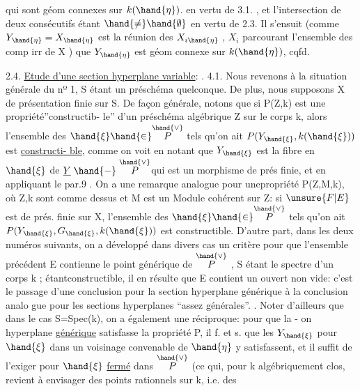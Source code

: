 
qui sont géom connexes sur $k(\hand{\eta})$. en vertu de 3.1. , et  l'intersection
de deux consécutifs étant $\hand{\neq} \hand{\emptyset}$ en vertu de 2.3. Il s'ensuit (comme
$Y_{\hand{\eta}} = X_{\hand{\eta}}$ est la réunion des $X_{i\hand{\eta}}$ , $X_i$ parcourant l'ensemble des comp
irr de X ) que  $Y_{\hand{\eta}}$ est géom connexe sur $k(\hand{\eta})$, cqfd.

2.4. \uline{Etude d'une section hyperplane variable}:  .
4.1.
Nous revenons à la situation générale du nº 1, S étant un préschéma
quelconque. De plus, nous supposons X de présentation finie sur S.
De façon générale, notons que si P(Z,k) est une propriété''constructib-%
le''  d'un préschéma algébrique Z sur le corps k,
alors l'ensemble des $\hand{\xi} \hand{\in} \overset{\hand{\vee}}{P}$ tels qu'on ait $P(Y_{\hand{\xi}},k(\hand{\xi}))$ est \uline{constructi-%
ble}, comme on voit en notant que $Y_{\hand{\xi}}$ est la fibre en $\hand{\xi}$ de $\underline{Y} \mathrel{\hand{-}} \overset{\hand{\vee}}{P}$\hand{,}qui
est un morphisme de prés finie, et en appliquant le par.9 . On a une
remarque analogue pour une\hand{|}propriété P(Z,M,k), où Z,k sont comme dessus
et M est un Module cohérent sur Z: si $\unsure{F|E}$ est de prés. finie sur X, l'ensemble
des $\hand{\xi} \hand{\in} \overset{\hand{\vee}}{P}$ tels qu'on ait $P(Y_{\hand{\xi}},G_{\hand{\xi}},k(\hand{\xi}))$ est constructible. D'autre
part, dans les deux numéros suivants, on a développé  dans divers
cas un critère pour que l'ensemble précédent E contienne le point
générique de $\overset{\hand{\vee}}{P}$ , S étant le spectre d'un corps k ; étantconstructible,
il en résulte que E contient un ouvert non vide: c'est le passage d'une
conclusion pour la section hyperplane générique à la conclusion analo
gue pour les sections hyperplanes ``assez générales''.  \hand{[}\hand{]}. Noter d'ailleurs que \placedmargin{$\downarrow$}
dans le cas S=Spec(k), on a également une réciproque: pour que la -%
on hyperplane \uline{générique} satisfasse la propriété P, il f. et s. que
les $Y_{\hand{\xi}}$ pour $\hand{\xi}$ dans un voisinage convenable de $\hand{\eta}$ y satisfassent, et il
suffit de l'exiger pour $\hand{\xi}$ \uline{fermé} dans $\overset{\hand{\vee}}{P}$ (ce qui, pour k algébriquement
clos, revient à envisager des points rationnels sur k, i.e. des


